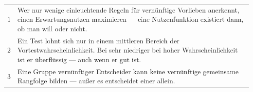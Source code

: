 \begin{merksatz}
\begin{center}
{\small
\renewcommand{\arraystretch}{1.55}
\begin{tabular}{@{}P{1.0cm}P{7.4cm}@{}}
\toprule
$1$ & Wer nur wenige einleuchtende Regeln für vernünftige Vorlieben anerkennt,  einen Erwartungsnutzen maximieren --- eine Nutzenfunktion existiert dann, ob man will oder nicht. \\
$2$ & Ein Test lohnt sich nur in einem mittleren Bereich der Vortestwahrscheinlichkeit. Bei sehr niedriger  bei hoher Wahrscheinlichkeit ist er überflüssig --- auch wenn er gut ist. \\
$3$ & Eine Gruppe vernünftiger Entscheider kann keine vernünftige gemeinsame Rangfolge bilden --- außer es entscheidet einer allein. \\
\bottomrule
\end{tabular}}
\end{center}

\begin{center}
\begin{minipage}{0.88\textwidth}
\end{minipage}
\end{center}
\end{merksatz}

